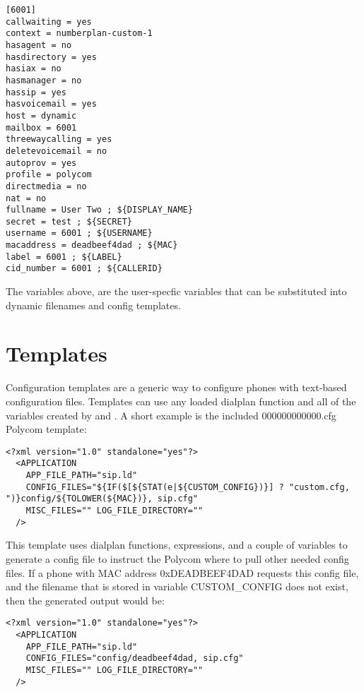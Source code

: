 \begin{astlisting}
\begin{verbatim}
[6001]
callwaiting = yes
context = numberplan-custom-1
hasagent = no
hasdirectory = yes
hasiax = no
hasmanager = no
hassip = yes
hasvoicemail = yes
host = dynamic
mailbox = 6001
threewaycalling = yes
deletevoicemail = no
autoprov = yes
profile = polycom
directmedia = no
nat = no
fullname = User Two ; ${DISPLAY_NAME}
secret = test ; ${SECRET}
username = 6001 ; ${USERNAME}
macaddress = deadbeef4dad ; ${MAC}
label = 6001 ; ${LABEL}
cid_number = 6001 ; ${CALLERID}
\end{verbatim}
\end{astlisting}

The variables above, are the user-specfic variables that can be substituted into dynamic 
filenames and config templates.

\section{Templates}

Configuration templates are a generic way to configure phones with text-based 
configuration files. Templates can use any loaded dialplan function and all of the 
variables created by  and . A short example is the 
included 000000000000.cfg Polycom template:

\begin{astlisting}
\begin{verbatim}
<?xml version="1.0" standalone="yes"?>
  <APPLICATION 
    APP_FILE_PATH="sip.ld"
    CONFIG_FILES="${IF($[${STAT(e|${CUSTOM_CONFIG})}] ? "custom.cfg, 
")}config/${TOLOWER(${MAC})}, sip.cfg"
    MISC_FILES="" LOG_FILE_DIRECTORY=""
  />
\end{verbatim}
\end{astlisting}

This template uses dialplan functions, expressions, and a couple of variables to generate 
a config file to instruct the Polycom where to pull other needed config files. If a phone 
with MAC address 0xDEADBEEF4DAD requests this config file, and the filename that is 
stored in variable CUSTOM\_CONFIG does not exist, then the generated output would be:

\begin{astlisting}
\begin{verbatim}
<?xml version="1.0" standalone="yes"?>
  <APPLICATION
    APP_FILE_PATH="sip.ld"
    CONFIG_FILES="config/deadbeef4dad, sip.cfg"
    MISC_FILES="" LOG_FILE_DIRECTORY=""
  />
\end{verbatim}
\end{astlisting}

